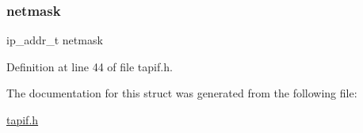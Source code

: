 \subsubsection{\texorpdfstring{netmask}{netmask}}
{\footnotesize\ttfamily ip\+\_\+addr\+\_\+t netmask}



Definition at line 44 of file tapif.\+h.



The documentation for this struct was generated from the following file\+:\begin{DoxyCompactItemize}
\item 
\hyperlink{tapif_8h}{tapif.\+h}\end{DoxyCompactItemize}
